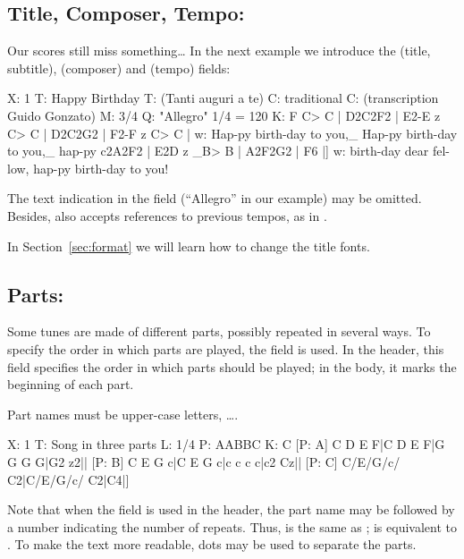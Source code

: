 \documentclass[a4paper,12pt]{book}
\begin{document}

\subsection{Title, Composer, Tempo: }

Our scores still miss something{\ldots} In the next example we
introduce the  (title, subtitle),  (composer) and
 (tempo) fields:

\begin{abcsource}
X: 1
T: Happy Birthday     %
T: (Tanti auguri a te)  %
C: traditional        %
C: (transcription Guido Gonzato)
M: 3/4
Q: "Allegro" 1/4 = 120 %
K: F
C> C | D2C2F2 | E2-E z C> C | D2C2G2 | F2-F z C> C |
w: Hap-py birth-day to you,_ Hap-py birth-day to you,_ hap-py
c2A2F2 | E2D z _B> B | A2F2G2 | F6 |]
w: birth-day dear fel-low, hap-py birth-day to you!
\end{abcsource}


The text indication in the  field (``Allegro'' in our
example) may be omitted. Besides,  also accepts references
to previous tempos, as in .

In Section~\ref{sec:format} we will learn how to change the title
fonts.


\subsection{Parts: }
\label{sec:parts}

Some tunes are made of different parts, possibly repeated in several
ways. To specify the order in which parts are played, the 
field is used. In the header, this field specifies the order in which
parts should be played; in the body, it marks the beginning of each
part.

Part names must be upper-case letters, \ldots{}.

\begin{abcsource}
X: 1
T: Song in three parts
L: 1/4
P: AABBC %
K: C
[P: A] C D E F|C D E F|G G G G|G2 z2||
[P: B] C E G c|C E G c|c c c c|c2 Cz||
[P: C] C/E/G/c/ C2|C/E/G/c/ C2|C4|]
\end{abcsource}


Note that when the  field is used in the header, the part
name may be followed by a number indicating the number of repeats.
Thus,  is the same as ;  is
equivalent to . To make the text more readable, dots
may be used to separate the parts.
\end{document}
